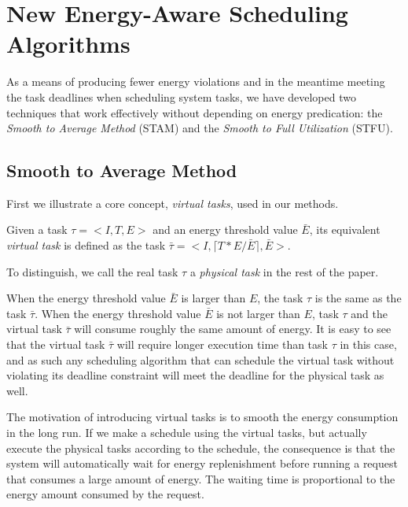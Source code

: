 
\section{New Energy-Aware Scheduling Algorithms} \label{sec:algorithms}

As a means of producing fewer energy violations and in the meantime meeting the task deadlines when scheduling system tasks, we have developed two techniques that work effectively without depending on energy predication: the \emph{Smooth to Average Method} (\textsc{STAM}) and the \emph{Smooth to Full Utilization} (\textsc{STFU}). 

\subsection{Smooth to Average Method}
First we illustrate a core concept, \emph{virtual tasks}, used in our methods.

\begin{definition}
Given a task $\tau = <I, T, E>$ and an energy threshold value $\bar{E}$, its equivalent \emph{virtual task} is defined as the task $\bar{\tau} = <I, \lceil T *  E/\bar{E} \rceil, \bar{E}>$.
\end{definition}

To distinguish, we call the real task $\tau$ a \emph{physical task} in the rest of the paper.

\begin{remark}
When the energy threshold value $\bar{E}$ is larger than $E$, the task $\tau$ is the same as the task $\bar{\tau}$. When the energy threshold value $\bar{E}$ is not larger than $E$, task $\tau$ and the virtual task $\bar{\tau}$ will consume roughly the same amount of energy. It is easy to see that the virtual task $\bar{\tau}$ will require longer execution time than task $\tau$ in this case, and as such any scheduling algorithm that can schedule the virtual task without violating its deadline constraint will meet the deadline for the physical task as well. 
\end{remark}
\begin{remark}
The motivation of introducing virtual tasks is to smooth the energy consumption in the long run. If we make a schedule using the virtual tasks, but actually execute the physical tasks according to the schedule, the consequence is that the system will automatically wait for energy replenishment before running a request that consumes a large amount of energy. The waiting time is proportional to the energy amount consumed by the request.
\end{remark}

